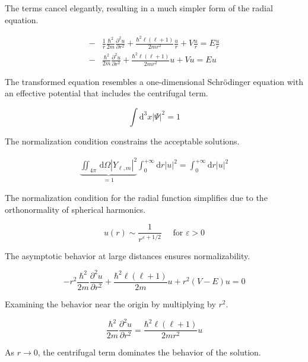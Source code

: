 \documentclass[italian]{HKNdocument}
\begin{document}
The terms cancel elegantly, resulting in a much simpler form of the radial equation.

\begin{align}
- & \frac{1}{r} \frac{\hbar^{2}}{2 m} \frac{\partial^{2} u}{\partial r^{2}}+\frac{\hbar^{2} \ell(\ell+1)}{2 m r^{2}} \frac{u}{r}+V \frac{u}{r}=E \frac{u}{r}  \\
- & \frac{\hbar^{2}}{2 m} \frac{\partial^{2} u}{\partial r^{2}}+\frac{\hbar^{2} \ell(\ell+1)}{2 m r^{2}} u+V u=E u
\end{align}

The transformed equation resembles a one-dimensional Schrödinger equation with an effective potential that includes the centrifugal term.

\begin{equation}
\int \mathrm{d}^{3} x|\Psi|^{2}=1
\end{equation}

The normalization condition constrains the acceptable solutions.

\begin{align}
\underbrace{\iint_{4 \pi} \, \mathrm{d} \Omega\left|Y_{\ell, m}\right|^{2}}_{=1} \int_{0}^{+\infty} \mathrm{d} r |u|^{2} = \int_{0}^{+\infty} \mathrm{d} r|u|^{2}
\end{align}

The normalization condition for the radial function simplifies due to the orthonormality of spherical harmonics.

\begin{equation}
u(r) \sim \frac{1}{r^{\varepsilon+1 / 2}} \quad \text { for } \varepsilon>0
\end{equation}

The asymptotic behavior at large distances ensures normalizability.

\begin{equation}
-r^{2} \frac{\hbar^{2}}{2 m} \frac{\partial^{2} u}{\partial r^{2}}+\frac{\hbar^{2} \ell(\ell+1)}{2 m} u+r^{2}(V-E) u=0
\end{equation}

Examining the behavior near the origin by multiplying by $r^2$.

\begin{equation}
\frac{\hbar^{2}}{2 m} \frac{\partial^{2} u}{\partial r^{2}}=\frac{\hbar^{2} \ell(\ell+1)}{2 m r^{2}} u
\end{equation}

As $r \to 0$, the centrifugal term dominates the behavior of the solution.
\end{document}
